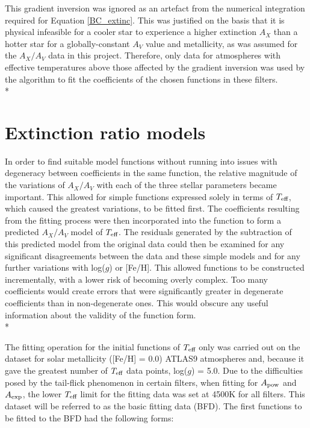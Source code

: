 \documentclass[12pt, a4paper]{report}
\begin{document}
This gradient inversion was ignored as an artefact from the numerical integration required for Equation \ref{BC_extinc}. This was justified on the basis that it is physical infeasible for a cooler star to experience a higher extinction $A_{X}$ than a hotter star for a globally-constant $A_{V}$ value and metallicity, as was assumed for the $A_{X}/A_{V}$ data in this project. Therefore, only data for atmospheres with effective temperatures above those affected by the gradient inversion was used by the algorithm to fit the coefficients of the chosen functions in these filters.\\*

\section{Extinction ratio models} \label{ext_models}

In order to find suitable model functions without running into issues with degeneracy between coefficients in the same function, the relative magnitude of the variations of $A_{X}/A_{V}$ with each of the three stellar parameters became important. This allowed for simple functions expressed solely in terms of $T_{\textnormal{eff}}$, which caused the greatest variations, to be fitted first. The coefficients resulting from the fitting process were then incorporated into the function to form a predicted $A_{X}/A_{V}$ model of $T_{\textnormal{eff}}$. The residuals generated by the subtraction of this predicted model from the original data could then be examined for any significant disagreements between the data and these simple models and for any further variations with log($g$) or [Fe/H]. This allowed functions to be constructed incrementally, with a lower risk of becoming overly complex. Too many coefficients would create errors that were significantly greater in degenerate coefficients than in non-degenerate ones. This would obscure any useful information about the validity of the function form. \\*

The fitting operation for the initial functions of $T_{\textnormal{eff}}$ only was carried out on the dataset for solar metallicity ([Fe/H] = 0.0) ATLAS9 atmospheres and, because it gave the greatest number of $T_{\textnormal{eff}}$ data points, log($g$) = 5.0. Due to the difficulties posed by the tail-flick phenomenon in certain filters, when fitting for $A_{\textnormal{pow}}$ and $A_{\textnormal{exp}}$, the lower $T_{\textnormal{eff}}$ limit for the fitting data was set at 4500K for all filters. This dataset will be referred to as the basic fitting data (BFD). The first functions to be fitted to the BFD had the following forms:
\end{document}

